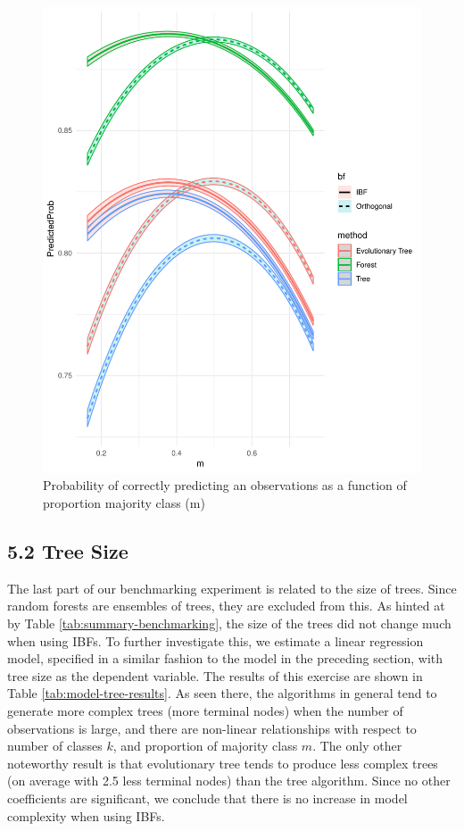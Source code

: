 \documentclass[]{elsarticle} %
\makeatletter
\def\maxwidth{\ifdim\Gin@nat@width>\linewidth\linewidth
\else\Gin@nat@width\fi}
\let\Oldincludegraphics\includegraphics
\renewcommand{\includegraphics}[1]{\Oldincludegraphics[width=\maxwidth]{#1}}
\makeatother
\begin{document}
\begin{figure}
\centering
\includegraphics{Trees_with_Base_Functions_v2_files/figure-latex/fig15-estimated-accuracy-m-1.pdf}
\caption{\label{fig:fig15-estimated-accuracy-m}Probability of correctly
predicting an observations as a function of proportion majority class
(m)}
\end{figure}

\subsection{5.2 Tree Size}\label{tree-size}

The last part of our benchmarking experiment is related to the size of
trees. Since random forests are ensembles of trees, they are excluded
from this. As hinted at by Table \ref{tab:summary-benchmarking}, the
size of the trees did not change much when using IBFs. To further
investigate this, we estimate a linear regression model, specified in a
similar fashion to the model in the preceding section, with tree size as
the dependent variable. The results of this exercise are shown in Table
\ref{tab:model-tree-results}. As seen there, the algorithms in general
tend to generate more complex trees (more terminal nodes) when the
number of observations is large, and there are non-linear relationships
with respect to number of classes \(k\), and proportion of majority
class \(m\). The only other noteworthy result is that evolutionary tree
tends to produce less complex trees (on average with 2.5 less terminal
nodes) than the tree algorithm. Since no other coefficients are
significant, we conclude that there is no increase in model complexity
when using IBFs.
\end{document}
